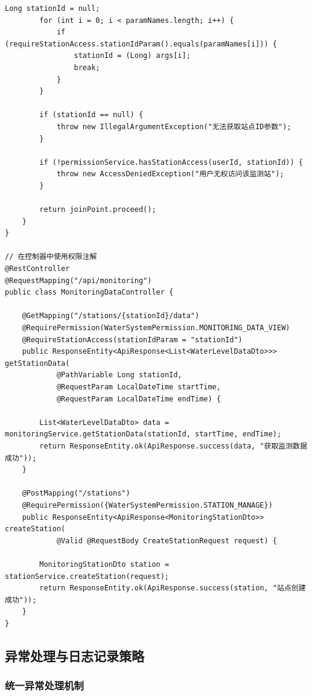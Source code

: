 \begin{lstlisting}[style=java]
        Long stationId = null;
        for (int i = 0; i < paramNames.length; i++) {
            if (requireStationAccess.stationIdParam().equals(paramNames[i])) {
                stationId = (Long) args[i];
                break;
            }
        }
        
        if (stationId == null) {
            throw new IllegalArgumentException("无法获取站点ID参数");
        }
        
        if (!permissionService.hasStationAccess(userId, stationId)) {
            throw new AccessDeniedException("用户无权访问该监测站");
        }
        
        return joinPoint.proceed();
    }
}

// 在控制器中使用权限注解
@RestController
@RequestMapping("/api/monitoring")
public class MonitoringDataController {
    
    @GetMapping("/stations/{stationId}/data")
    @RequirePermission(WaterSystemPermission.MONITORING_DATA_VIEW)
    @RequireStationAccess(stationIdParam = "stationId")
    public ResponseEntity<ApiResponse<List<WaterLevelDataDto>>> getStationData(
            @PathVariable Long stationId,
            @RequestParam LocalDateTime startTime,
            @RequestParam LocalDateTime endTime) {
        
        List<WaterLevelDataDto> data = monitoringService.getStationData(stationId, startTime, endTime);
        return ResponseEntity.ok(ApiResponse.success(data, "获取监测数据成功"));
    }
    
    @PostMapping("/stations")
    @RequirePermission({WaterSystemPermission.STATION_MANAGE})
    public ResponseEntity<ApiResponse<MonitoringStationDto>> createStation(
            @Valid @RequestBody CreateStationRequest request) {
        
        MonitoringStationDto station = stationService.createStation(request);
        return ResponseEntity.ok(ApiResponse.success(station, "站点创建成功"));
    }
}
\end{lstlisting}

\hypertarget{ux5f02ux5e38ux5904ux7406ux4e0eux65e5ux5fd7ux8bb0ux5f55ux7b56ux7565}{%
\subsection{异常处理与日志记录策略}\label{ux5f02ux5e38ux5904ux7406ux4e0eux65e5ux5fd7ux8bb0ux5f55ux7b56ux7565}}

\hypertarget{ux7edfux4e00ux5f02ux5e38ux5904ux7406ux673aux5236}{%
\subsubsection{统一异常处理机制}\label{ux7edfux4e00ux5f02ux5e38ux5904ux7406ux673aux5236}}

